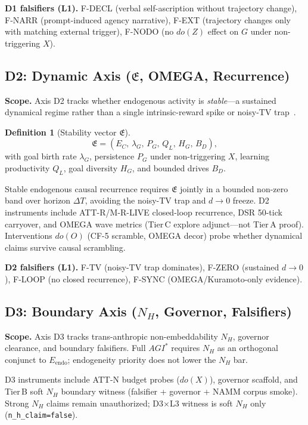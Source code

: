 \documentclass[11pt,a4paper]{article}
\theoremstyle{definition}
\newtheorem{definition}{Definition}
\begin{document}
\textbf{D1 falsifiers (L1).} F-DECL (verbal self-ascription without trajectory change), F-NARR (prompt-induced agency narrative), F-EXT (trajectory changes only with matching external trigger), F-NODO (no $do(Z)$ effect on $G$ under non-triggering $X$).

\subsection{D2: Dynamic Axis ($\mathfrak{E}$, OMEGA, Recurrence)}

\textbf{Scope.} Axis D2 tracks whether endogenous activity is \emph{stable}---a sustained dynamical regime rather than a single intrinsic-reward spike or noisy-TV trap~\cite{kuznetsov2026stable,kuznetsov2026theorytz}.

\begin{definition}[Stability vector $\mathfrak{E}$]
\begin{equation}
\mathfrak{E} = (E_C,\, \lambda_G,\, P_G,\, Q_L,\, H_G,\, B_D),
\end{equation}
with goal birth rate $\lambda_G$, persistence $P_G$ under non-triggering $X$, learning productivity $Q_L$, goal diversity $H_G$, and bounded drives $B_D$.
\end{definition}

Stable endogenous causal recurrence requires $\mathfrak{E}$ jointly in a bounded non-zero band over horizon $\Delta T$, avoiding the noisy-TV trap and $d\to 0$ freeze. D2 instruments include ATT-R/M-R-LIVE closed-loop recurrence, DSR 50-tick carryover, and OMEGA wave metrics (Tier\,C explore adjunct---not Tier\,A proof). Interventions $do(O)$ (CF-5 scramble, OMEGA decor) probe whether dynamical claims survive causal scrambling.

\textbf{D2 falsifiers (L1).} F-TV (noisy-TV trap dominates), F-ZERO (sustained $d\to 0$), F-LOOP (no closed recurrence), F-SYNC (OMEGA/Kuramoto-only evidence).

\subsection{D3: Boundary Axis ($N_H$, Governor, Falsifiers)}

\textbf{Scope.} Axis D3 tracks trans-anthropic non-embeddability $N_H$, governor clearance, and boundary falsifiers. Full $AGI^{*}$ requires $N_H$ as an orthogonal conjunct to $E_{\mathrm{endo}}$; endogeneity priority does not lower the $N_H$ bar.

D3 instruments include ATT-N budget probes ($do(X)$), governor scaffold, and Tier\,B soft $N_H$ boundary witness (falsifier + governor + NAMM corpus smoke). Strong $N_H$ claims remain unauthorized; D3$\times$L3 witness is soft $N_H$ only (\texttt{n\_h\_claim=false}).
\end{document}
